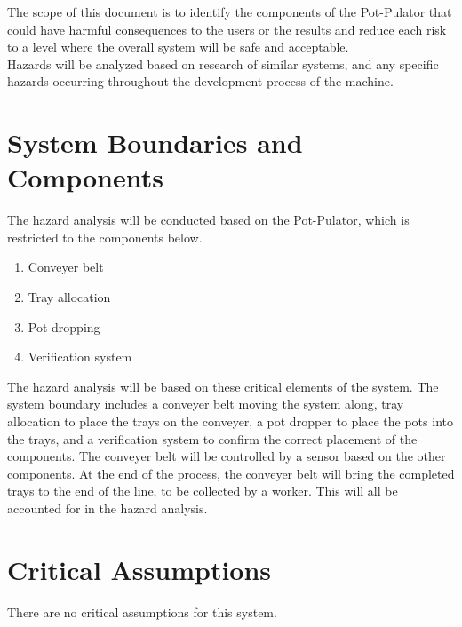 \documentclass{article}
\begin{document}
\noindent The scope of this document is to identify the components of the Pot-Pulator that could have harmful consequences to the users or the results and reduce each risk to a level where the overall system will be safe and acceptable. 
\\

\noindent Hazards will be analyzed based on research of similar systems, and any specific hazards occurring throughout the development process of the machine. 

\section{System Boundaries and Components}

The hazard analysis will be conducted based on the Pot-Pulator, which is restricted to the components below. 
\\

\begin{enumerate}
    \item Conveyer belt
    \item Tray allocation
    \item Pot dropping
    \item Verification system
\end{enumerate}

\noindent The hazard analysis will be based on these critical elements of the system. The system boundary includes a conveyer belt moving the system along, tray allocation to place the trays on the conveyer, a pot dropper to place the pots into the trays, and a verification system to confirm the correct placement of the components. 
\clearpage
\noindent The conveyer belt will be controlled by a sensor based on the other components. At the end of the process, the conveyer belt will bring the completed trays to the end of the line, to be collected by a worker. This will all be accounted for in the hazard analysis. 

\section{Critical Assumptions}

There are no critical assumptions for this system.
\end{document}

